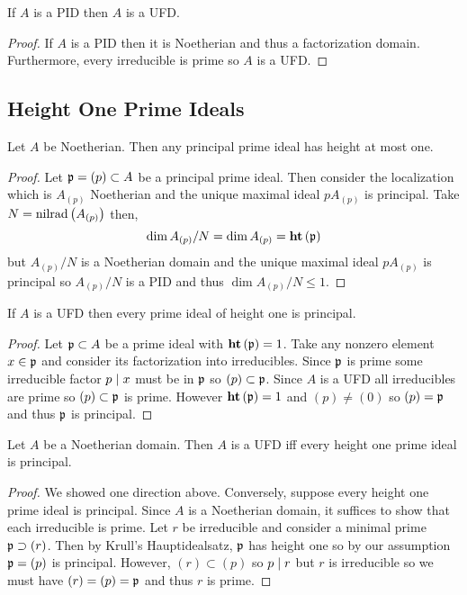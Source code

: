 \documentclass[12pt]{article}
\begin{document}
\begin{corollary}
If $A$ is a PID then $A$ is a UFD.
\end{corollary}

\begin{proof}
If $A$ is a PID then it is Noetherian and thus a factorization domain. Furthermore, every irreducible is prime so $A$ is a UFD.
\end{proof}

\subsection{Height One Prime Ideals}

\begin{proposition}
Let $A$ be Noetherian. Then any principal prime ideal has height at most one.
\end{proposition}

\begin{proof}
Let $\mathfrak{p} = (p) \subset A$ be a principal prime ideal. Then consider the localization which is $A_{(p)}$ Noetherian and the unique maximal ideal $p A_{(p)}$ is principal. Take $N = \mathrm{nilrad}\left( A_{(p)} \right)$ then,
\[ \dim{A_{(p)}/N} = \dim{A_{(p)}} = \mathbf{ht}\left( \mathfrak{p} \right) \]
but $A_{(p)} / N$ is a Noetherian domain and the unique maximal ideal $p A_{(p)}$ is principal so $A_{(p)} / N$ is a PID and thus $\dim{A_{(p)} / N} \le 1$. 
\end{proof}

\begin{proposition}
If $A$ is a UFD then every prime ideal of height one is principal.
\end{proposition}

\begin{proof}
Let $\mathfrak{p} \subset A$ be a prime ideal with $\mathbf{ht}\left( \mathfrak{p} \right) = 1$. Take any nonzero element $x \in \mathfrak{p}$ and consider its factorization into irreducibles. Since $\mathfrak{p}$ is prime some irreducible factor $p \mid x$ must be in $\mathfrak{p}$ so $(p) \subset \mathfrak{p}$. Since $A$ is a UFD all irreducibles are prime so $(p) \subset \mathfrak{p}$ is prime. However $\mathbf{ht}\left( \mathfrak{p} \right) = 1$ and $(p) \neq (0)$ so $(p) = \mathfrak{p}$ and thus $\mathfrak{p}$ is principal.
\end{proof}

\begin{theorem}
Let $A$ be a Noetherian domain. Then $A$ is a UFD iff every height one prime ideal is principal. 
\end{theorem}

\begin{proof}
We showed one direction above. Conversely, suppose every height one prime ideal is principal. Since $A$ is a Noetherian domain, it suffices to show that each irreducible is prime. Let $r$ be irreducible and consider a minimal prime $\mathfrak{p} \supset (r)$. Then by Krull's Hauptidealsatz, $\mathfrak{p}$ has height one so by our assumption $\mathfrak{p} = (p)$ is principal. However, $(r) \subset (p)$ so $p \mid r$ but $r$ is irreducible so we must have $(r) = (p) = \mathfrak{p}$ and thus $r$ is prime.
\end{proof}
\end{document}
